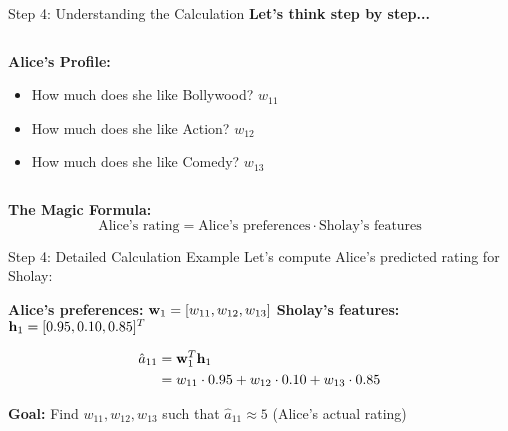\documentclass{beamer}
\begin{document}
\begin{frame}{Step 4: Understanding the Calculation}
\textbf{Let's think step by step...}

\pause
\begin{columns}[T]
\begin{column}{0.5\textwidth}
\textbf{Alice's Profile:}
\begin{itemize}[<+->]
    \item How much does she like Bollywood? $w_{11}$
    \item How much does she like Action? $w_{12}$
    \item How much does she like Comedy? $w_{13}$
\end{itemize}
\end{column}
\begin{column}{0.5\textwidth}
\end{column}
\end{columns}

\pause
\vspace{0.5cm}
\textbf{The Magic Formula:} 
$$\text{Alice's rating} = \text{Alice's preferences} \cdot \text{Sholay's features}$$
\end{frame}

\begin{frame}{Step 4: Detailed Calculation Example}
Let's compute Alice's predicted rating for Sholay:

\pause
\textbf{Alice's preferences:} $\mathbf{w}_1 = [w_{11}, w_{12}, w_{13}]$
\textbf{Sholay's features:} $\mathbf{h}_1 = [0.95, 0.10, 0.85]^T$

\pause
\begin{align}
\hat{a}_{11} &= \mathbf{w}_1^T \mathbf{h}_1 \\
&= w_{11} \cdot 0.95 + w_{12} \cdot 0.10 + w_{13} \cdot 0.85
\end{align}

\pause
\textbf{Goal:} Find $w_{11}, w_{12}, w_{13}$ such that $\hat{a}_{11} \approx 5$ (Alice's actual rating)
\end{frame}
\end{document}
